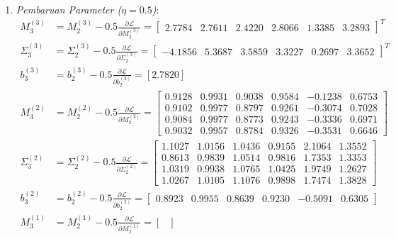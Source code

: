 \documentclass[11pt,a4paper]{article}
\def\mathbf#1{#1}%
\theoremstyle{plain}
\theoremstyle{definition}
\theoremstyle{remark}
\begin{document}
\begin{enumerate}
    \item \textit{Pembaruan Parameter ($\eta = 0.5$)}:
    \begin{align}
        M^{(3)}_3 &= M^{(3)}_2 - 0.5 \frac{\partial \mathcal{L}}{\partial M^{(3)}_2} = \begin{bmatrix} 2.7784 & 2.7611 & 2.4220 & 2.8066 & 1.3385 & 3.2893 \end{bmatrix}^T \\[0.2em]
        \Sigma^{(3)}_3 &= \Sigma^{(3)}_2 - 0.5 \frac{\partial \mathcal{L}}{\partial \Sigma^{(3)}_2} = \begin{bmatrix} -4.1856 & 5.3687 & 3.5859 & 3.3227 & 0.2697 & 3.3652 \end{bmatrix}^T \\[0.2em]
        \mathbf{b}^{(3)}_3 &= \mathbf{b}^{(3)}_2 - 0.5 \frac{\partial \mathcal{L}}{\partial \mathbf{b}^{(3)}_2} = [2.7820] \\[0.2em]
        M^{(2)}_3 &= M^{(2)}_2 - 0.5 \frac{\partial \mathcal{L}}{\partial M^{(2)}_2} = \begin{bmatrix}
            0.9128 & 0.9931 & 0.9038 & 0.9584 & -0.1238 & 0.6753 \\
            0.9102 & 0.9977 & 0.8797 & 0.9261 & -0.3074 & 0.7028 \\
            0.9084 & 0.9977 & 0.8773 & 0.9243 & -0.3336 & 0.6971 \\
            0.9032 & 0.9957 & 0.8784 & 0.9326 & -0.3531 & 0.6646
        \end{bmatrix} \\[0.2em]
        \Sigma^{(2)}_3 &= \Sigma^{(2)}_2 - 0.5 \frac{\partial \mathcal{L}}{\partial \Sigma^{(2)}_2} = \begin{bmatrix}
            1.1027 & 1.0156 & 1.0436 & 0.9155 & 2.1064 & 1.3552 \\
            0.8613 & 0.9839 & 1.0514 & 0.9816 & 1.7353 & 1.3353 \\
            1.0319 & 0.9938 & 1.0765 & 1.0425 & 1.9749 & 1.2627 \\
            1.0267 & 1.0105 & 1.1076 & 0.9898 & 1.7474 & 1.3828
        \end{bmatrix} \\[0.2em]
        \mathbf{b}^{(2)}_3 &= \mathbf{b}^{(2)}_2 - 0.5 \frac{\partial \mathcal{L}}{\partial \mathbf{b}^{(2)}_2} = \begin{bmatrix} 0.8923 & 0.9955 & 0.8639 & 0.9230 & -0.5091 & 0.6305 \end{bmatrix} \\[0.2em]
        M^{(1)}_3 &= M^{(1)}_2 - 0.5 \frac{\partial \mathcal{L}}{\partial M^{(1)}_2} = \begin{bmatrix}

\end{bmatrix}
\end{align}
\end{enumerate}
\end{document}
